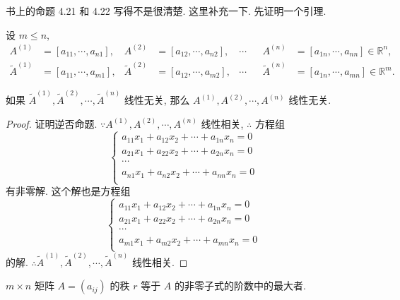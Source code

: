 \documentclass{ctexart}
\begin{document}
书上的命题 4.21 和 4.22 写得不是很清楚. 这里补充一下. 先证明一个引理.
\begin{lemma}\label{l3.1}
    设 $m\leq n$,
    \begin{align*}
        A^{(1)} & =[a_{11},\cdots,a_{n1}], & A^{(2)} & =[a_{12},\cdots,a_{n2}], & \cdots && A^{(n)} & =[a_{1n},\cdots,a_{nn}]\in\mathbb{R}^n, \\
        \widetilde{A}^{(1)} & =[a_{11},\cdots,a_{m1}], & \widetilde{A}^{(2)} & =[a_{12},\cdots,a_{m2}], & \cdots && \widetilde{A}^{(n)} & =[a_{1n},\cdots,a_{mn}]\in\mathbb{R}^m.
    \end{align*}
    
    如果 $\widetilde{A}^{(1)},\widetilde{A}^{(2)},\cdots,\widetilde{A}^{(n)}$ 线性无关, 那么 $A^{(1)},A^{(2)},\cdots,A^{(n)}$ 线性无关.
\end{lemma}
\begin{proof}
    证明逆否命题. $\because A^{(1)},A^{(2)},\cdots,A^{(n)}$ 线性相关, $\therefore$ 方程组
    \[\begin{cases}
        a_{11}x_1+a_{12}x_2+\cdots+a_{1n}x_n=0 \\
        a_{21}x_1+a_{22}x_2+\cdots+a_{2n}x_n=0 \\
        \cdots \\
        a_{n1}x_1+a_{n2}x_2+\cdots+a_{nn}x_n=0 \\
    \end{cases}\]
    有非零解. 这个解也是方程组
    \[\begin{cases}
        a_{11}x_1+a_{12}x_2+\cdots+a_{1n}x_n=0 \\
        a_{21}x_1+a_{22}x_2+\cdots+a_{2n}x_n=0 \\
        \cdots \\
        a_{m1}x_1+a_{m2}x_2+\cdots+a_{mn}x_n=0 \\
    \end{cases}\]
    的解. $\therefore\widetilde{A}^{(1)},\widetilde{A}^{(2)},\cdots,\widetilde{A}^{(n)}$ 线性相关.
\end{proof}
\begin{theorem}[书上的命题 4.21]\label{t3.2}
    $m\times n$ 矩阵 $A=(a_{ij})$ 的秩 $r$ 等于 $A$ 的非零子式的阶数中的最大者.
\end{theorem}
\end{document}
